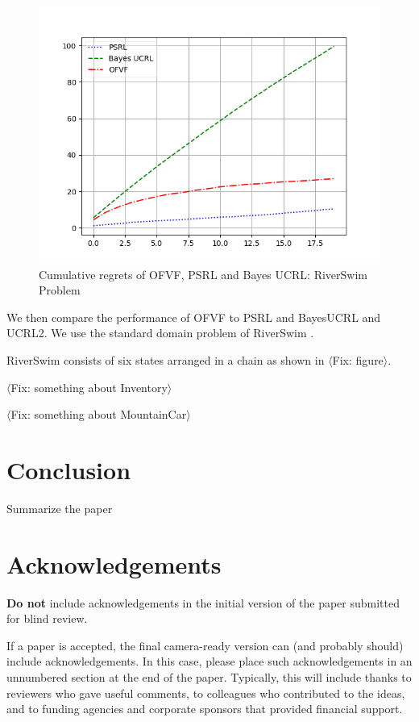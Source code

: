 \documentclass{article}
\newcommand{\fix}[1]{{$\langle${\color{red}\sc Fix: #1}$\rangle$}}
\begin{document}
\begin{figure}[h!]
	\centering
		\includegraphics[width=\linewidth]{figures/RiverSwim_RSVF_BAYESUCB_PSRL.png}
	\caption{Cumulative regrets of OFVF, PSRL and Bayes UCRL: RiverSwim Problem }
	\label{fig:dirichlet_result_RiverSwim}
\end{figure}

We then compare the performance of OFVF to PSRL and BayesUCRL and
UCRL2. We use the standard domain problem of
RiverSwim \cite{strehl2008analysis}.

RiverSwim consists of six states arranged in a chain as shown in
\fix{figure}.

\fix{something about Inventory}

\fix{something about MountainCar}

\section{Conclusion}

Summarize the paper

\section*{Acknowledgements}

\textbf{Do not} include acknowledgements in the initial version of
the paper submitted for blind review.

If a paper is accepted, the final camera-ready version can (and
probably should) include acknowledgements. In this case, please
place such acknowledgements in an unnumbered section at the
end of the paper. Typically, this will include thanks to reviewers
who gave useful comments, to colleagues who contributed to the ideas,
and to funding agencies and corporate sponsors that provided financial
support.
\end{document}
